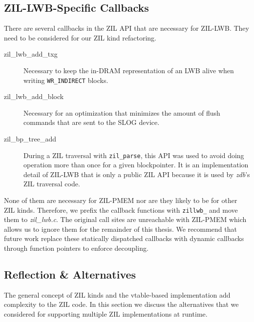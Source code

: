 \documentclass[12pt,a4paper,twoside]{book}
\begin{document}
\subsection{ZIL-LWB-Specific Callbacks}\label{sec:zil_kinds:callbacks}
There are several callbacks in the ZIL API that are necessary for ZIL-LWB.
They need to be considered for our ZIL kind refactoring.
\begin{description}
    \item[zil\_lwb\_add\_txg] Necessary to keep the in-DRAM representation of an LWB alive when writing \lstinline{WR_INDIRECT} blocks.
    \item[zil\_lwb\_add\_block] Necessary for an optimization that minimizes the amount of flush commands that are sent to the SLOG device.
    \item[zil\_bp\_tree\_add] During a ZIL traversal with \lstinline{zil_parse}, this API was used to avoid doing operation more than once for a given blockpointer.
    It is an implementation detail of ZIL-LWB that is only a public ZIL API because it is used by \textit{zdb}'s ZIL traversal code.
\end{description}
None of them are necessary for ZIL-PMEM nor are they likely to be for other ZIL kinds.
Therefore, we prefix the callback functions with \lstinline{zillwb_} and move them to \textit{zil\_lwb.c}.
The original call sites are unreachable with ZIL-PMEM which allows us to ignore them for the remainder of this thesis.
We recommend that future work replace these statically dispatched callbacks with dynamic callbacks through function pointers to enforce decoupling.

\subsection{Reflection \& Alternatives}\label{sec:zil_kinds:alternatives}
The general concept of ZIL kinds and the vtable-based implementation add complexity to the ZIL code.
In this section we discuss the alternatives that we considered for supporting multiple ZIL implementations at runtime.
\end{document}
